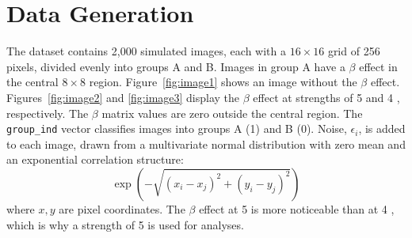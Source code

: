 \documentclass[12pt]{article}
\begin{document}
\section*{Data Generation}

The dataset contains 2,000 simulated images, each with a \( 16 \times 16 \) grid of 256 pixels, divided evenly into groups A and B. Images in group A have a \( \beta \) effect in the central \( 8 \times 8 \) region. Figure~\ref{fig:image1} shows an image without the \( \beta \) effect. Figures~\ref{fig:image2} and \ref{fig:image3} display the \( \beta \) effect at strengths of 5 and 4 , respectively. The \( \beta \) matrix values are zero outside the central region. The \texttt{group\_ind} vector classifies images into groups A (1) and B (0). Noise, \( \epsilon_i \), is added to each image, drawn from a multivariate normal distribution with zero mean and an exponential correlation structure:
\[
    \exp \left(-\sqrt{\left(x_i-x_j\right)^2+\left(y_i-y_j\right)^2}\right)
\]
where \(x, y\) are pixel coordinates. The \(\beta\) effect at 5 is more noticeable than at 4 , which is why a strength of 5 is used for analyses.


\end{document}
